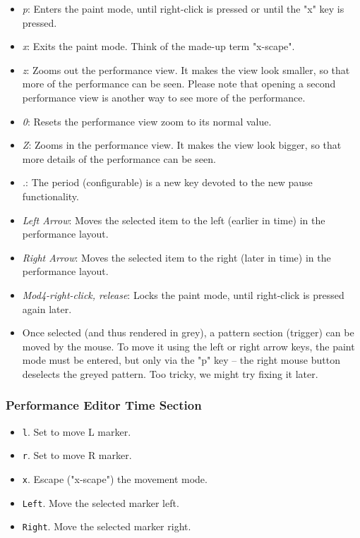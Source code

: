    \begin{itemize}
      \item \textsl{p}:  Enters the paint mode, until right-click is pressed or
         until the "x" key is pressed.
      \item \textsl{x}:  Exits the paint mode.  Think of the made-up term
         "x-scape".
      \item \textsl{z}:  Zooms out the performance view.  It makes the view
         look smaller, so that more of the performance can be seen.  Please
         note that opening a second performance view is another way to see more
         of the performance.
      \item \textsl{0}:  Resets the performance view zoom to its normal value.
      \item \textsl{Z}:  Zooms in the performance view.  It makes the view
         look bigger, so that more details of the performance can be seen.
      \item \textsl{.}:  The period (configurable) is a new key devoted to the
         new pause functionality.
      \item \textsl{Left Arrow}:  Moves the selected item to the left (earlier
         in time) in the performance layout.
      \item \textsl{Right Arrow}:  Moves the selected item to the right (later
         in time) in the performance layout.
      \item \textsl{Mod4-right-click, release}:  Locks the paint mode, until right-click
         is pressed again later.
      \item Once selected (and thus rendered in grey), a pattern section (trigger)
         can be moved by the mouse.  To move it using the left or right
         arrow keys, the paint mode must be entered, but only via the "p"
         key -- the right mouse button deselects the greyed pattern.
         Too tricky, we might try fixing it later.
   \end{itemize}

\subsubsection{Performance Editor Time Section}
\label{subsubsec:kbd_mouse_performance_editor_time_section}

   \begin{itemize}
      \item \texttt{l}.  Set to move L marker.
      \item \texttt{r}.  Set to move R marker.
      \item \texttt{x}.  Escape ("x-scape") the movement mode.
      \item \texttt{Left}.  Move the selected marker left.
      \item \texttt{Right}.  Move the selected marker right.
   \end{itemize}

